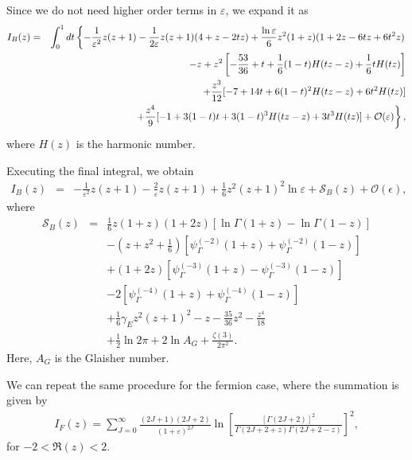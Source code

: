 \documentclass[12pt]{article}
\begin{document}
Since we do not need higher order terms in $\varepsilon$, we expand it
as
\begin{eqnarray}
 I_B(z)& = &\int_0^1dt
 \left\{
  -\frac{1}{\varepsilon^2}z(z+1)-\frac{1}{2\varepsilon}z(z+1)(4+z-2tz)
  +\frac{\ln\varepsilon}{6}z^2(1+z)(1+2z-6tz+6t^2z)\right.\nonumber\\
  &&\hspace{10ex}-z+z^2
  \left[
   -\frac{53}{36}+t+\frac{1}{6}(1-t)H(tz-z)+\frac{1}{6}tH(tz)
  \right]\nonumber\\
  &&\hspace{10ex}+\frac{z^3}{12}[-7+14t+6(1-t)^2H(tz-z)+6t^2H(tz)]\nonumber\\
  &&\hspace{10ex}\left.+\frac{z^4}{9}[-1+3(1-t)t+3(1-t)^3H(tz-z)+3t^3H(tz)]
  +\mathcal O(\varepsilon)
 \right\},
\end{eqnarray}
where $H(z)$ is the harmonic number.

Executing the final integral, we obtain
\begin{eqnarray}
 I_B(z)& = &-\frac{1}{\varepsilon^2}z(z+1)
 -\frac{2}{\varepsilon}z(z+1)
 +\frac{1}{6}z^2(z+1)^2\ln\varepsilon
 +\mathcal S_B(z)+\mathcal{O}(\epsilon),
\end{eqnarray}
where
\begin{eqnarray}
 \mathcal S_B(z)& = &\frac{1}{6}z(1+z)(1+2z)
 \left[
  \ln\Gamma(1+z)-\ln\Gamma(1-z)
 \right]\nonumber\\
 &&-
 \left(
  z+z^2+\frac{1}{6}
 \right)
 \left[
  \psi_{\Gamma}^{(-2)}(1+z)+\psi_{\Gamma}^{(-2)}(1-z)
 \right]\nonumber\\
 &&+(1+2z)
 \left[
  \psi_{\Gamma}^{(-3)}(1+z)-\psi_{\Gamma}^{(-3)}(1-z)
 \right]\nonumber\\
 &&-2
 \left[
  \psi_{\Gamma}^{(-4)}(1+z)+\psi_{\Gamma}^{(-4)}(1-z)
 \right]\nonumber\\
 &&+\frac{1}{6}\gamma_Ez^2(z+1)^2-z-\frac{35}{36}z^2-\frac{z^4}{18}\nonumber\\
 &&+\frac{1}{2}\ln 2\pi+2\ln A_G+\frac{\zeta(3)}{2\pi^2}.
\end{eqnarray}
Here, $A_G$ is the Glaisher number.

We can repeat the same procedure for the fermion case, where the
summation is given by
\begin{align}
 I_F(z) = \sum_{J=0}^\infty\frac{(2J+1)(2J+2)}{(1+\varepsilon)^{2J}}\ln
 \left[
  \frac{[\Gamma(2J+2)]^2}{\Gamma(2J+2+z)\Gamma(2J+2-z)}
 \right]^2,
\end{align}
for $-2<\Re(z)<2$.
\end{document}
